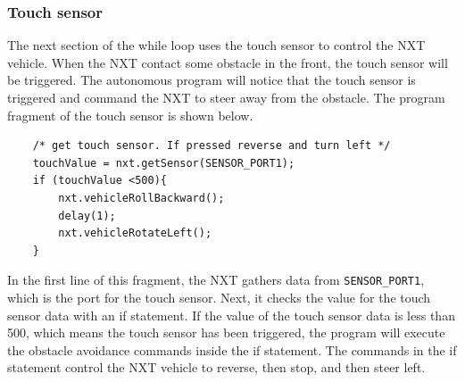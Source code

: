 \subsubsection*{Touch sensor}
The next section of the while loop uses the touch sensor to control the NXT vehicle.
When the NXT contact some obstacle in the front, the touch sensor will be triggered.
The autonomous program will notice that the touch sensor is triggered and command the NXT to steer away from the obstacle.
The program fragment of the touch sensor is shown below.
\begin{verbatim}
    /* get touch sensor. If pressed reverse and turn left */
    touchValue = nxt.getSensor(SENSOR_PORT1);
    if (touchValue <500){
        nxt.vehicleRollBackward();
        delay(1);
        nxt.vehicleRotateLeft();
    }
\end{verbatim}
In the first line of this fragment, the NXT gathers data from \verb+SENSOR_PORT1+, which is the port for the touch sensor.
Next, it checks the value for the touch sensor data with an if statement.
If the value of the touch sensor data is less than 500, which means the touch sensor has been triggered, the program
    will execute the obstacle avoidance commands inside the if statement.
The commands in the if statement control the NXT vehicle to reverse, then stop, and then steer left.

